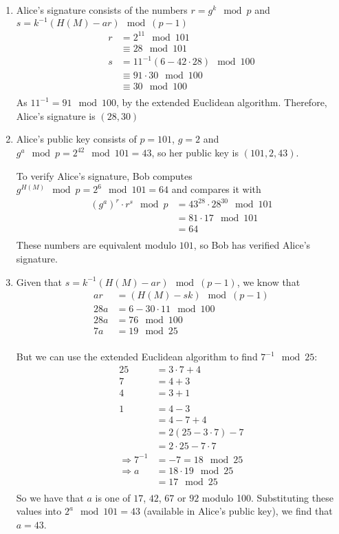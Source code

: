 \begin{enumerate}
\item Alice's signature consists of the numbers $r = g^k\mod p$ and
  $s = k^{-1}(H(M) - ar)\mod (p-1)$
  \begin{align*}
    r &= 2^{11} \mod 101 \\
      &\equiv 28 \mod 101 \\
    s &= 11^{-1}(6 - 42 \cdot 28)\mod 100 \\
      &\equiv 91 \cdot 30\mod 100 \\
      &\equiv 30 \mod 100\\
  \end{align*}
  As $11^{-1} = 91\mod 100$, by the extended Euclidean algorithm. Therefore, Alice's signature is $(28, 30)$

\item Alice's public key consists of $p = 101$, $g = 2$ and $g^a \mod p = 2^{42}
  \mod 101 = 43$, so her public key is $(101, 2, 43)$.

  To verify Alice's signature, Bob computes $g^{H(M)} \mod p = 2^6 \mod 101 = 64$
  and compares it with
  \begin{align*}
    (g^a)^r \cdot r^s \mod p &= 43^{28} \cdot 28^{30} \mod 101 \\
                             &= 81 \cdot 17 \mod 101 \\
                             &= 64 \\
  \end{align*}
  These numbers are equivalent modulo $101$, so Bob has verified Alice's signature.

\item Given that $s = k^{-1}(H(M) - ar)\mod (p-1)$, we know that
  \begin{align*}
    ar &= (H(M) - sk) \mod (p-1) \\
    28a &= 6 - 30 \cdot 11 \mod 100 \\
    28a &= 76 \mod 100 \\
    7a &= 19 \mod 25 \\
  \end{align*}

  But we can use the extended Euclidean algorithm to find $7^{-1} \mod 25$:
  \begin{align*}
    25 &= 3\cdot7 + 4 \\
    7 &= 4 + 3 \\
    4 &= 3 + 1 \\
    \\
    1 &= 4 - 3 \\
      &= 4 - 7 + 4 \\
      &= 2(25 - 3\cdot7) -7 \\
      &= 2\cdot25 - 7\cdot7 \\
  \Rightarrow 7^{-1} &= -7 = 18 \mod 25 \\
      \Rightarrow a &= 18 \cdot 19 \mod 25 \\
                    &= 17 \mod 25 \\
  \end{align*}
  So we have that $a$ is one of $17$, $42$, $67$ or $92$ modulo 100. Substituting
  these values into $2^{a} \mod 101 = 43$ (available in Alice's public key), we
  find that $a = 43$.

\end{enumerate}
